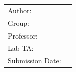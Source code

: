 \begin{titlepage}
  \centering


  \vspace{5mm}
  {\huge\MakeUppercase{\getFaculty{}}}\\

  \vspace{5mm}
  {\large\MakeUppercase{\getUniversity{}}}\\

  \vspace{20mm}
  {\Large \getDoctype{}}

  \vspace{15mm}
  {\huge\bfseries \getTitle{}}


  \vspace{15mm}
  \begin{tabular}{l l}
    Author:          & \getAuthor{} \\
    Group:           & \getLabGroup{} \\
    Professor:       & \getProfessor{} \\
    Lab TA:          & \getAdvisor{} \\
    Submission Date: & \getSubmissionDate{} \\
  \end{tabular}
\end{titlepage}